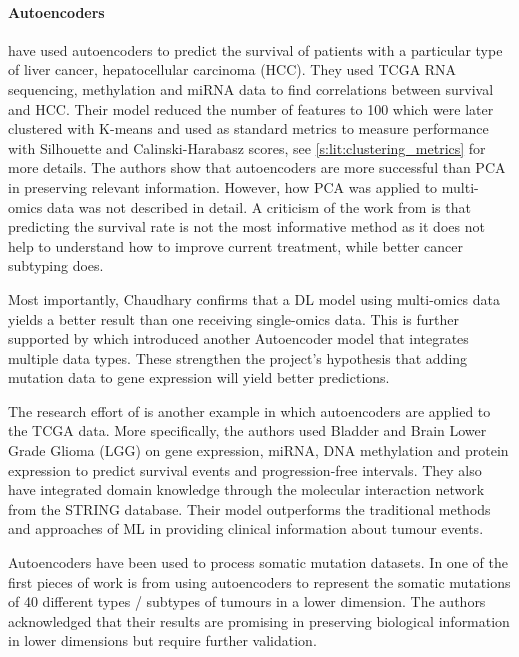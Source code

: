 \paragraph*{Autoencoders} \label{s:lit:autoencoders}

\citet{Chaudhary2018-qj} have used autoencoders to predict the survival of patients with a particular type of liver cancer, hepatocellular carcinoma (HCC). They used TCGA RNA sequencing, methylation and miRNA data to find correlations between survival and HCC. Their model reduced the number of features to 100 which were later clustered with K-means and used as standard metrics to measure performance with Silhouette and Calinski-Harabasz scores, see \cref{s:lit:clustering_metrics} for more details. The authors show that autoencoders are more successful than PCA in preserving relevant information. However, how PCA was applied to multi-omics data was not described in detail. A criticism of the work from \citeauthor{Chaudhary2018-qj} is that predicting the survival rate is not the most informative method as it does not help to understand how to improve current treatment, while better cancer subtyping does.

Most importantly, Chaudhary confirms that a DL model using multi-omics data yields a better result than one receiving single-omics data. This is further supported by \citet{Ma2019-hk} which introduced another Autoencoder model that integrates multiple data types. These strengthen the project's hypothesis that adding mutation data to gene expression will yield better predictions.

The research effort of \citet{Ma2019-hk} is another example in which autoencoders are applied to the TCGA data. More specifically, the authors used Bladder and Brain Lower Grade Glioma (LGG) on gene expression, miRNA, DNA methylation and protein expression to predict survival events and progression-free intervals. They also have integrated domain knowledge through the molecular interaction network from the STRING database. Their model outperforms the traditional methods and approaches of ML in providing clinical information about tumour events.

Autoencoders have been used to process somatic mutation datasets. In one of the first pieces of work is from \cite{Palazzo2019-hx} using autoencoders to represent the somatic mutations of 40 different types / subtypes of tumours in a lower dimension. The authors acknowledged that their results are promising in preserving biological information in lower dimensions but require further validation.

